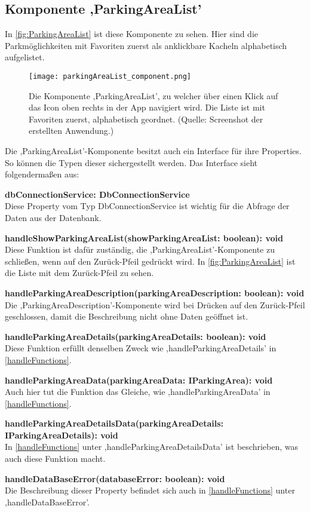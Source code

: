 \subsection{Komponente ,ParkingAreaList'}
\label{parkingAreaList}
In \autoref{fig:ParkingAreaList} ist diese Komponente zu sehen. Hier sind die Parkmöglichkeiten mit Favoriten zuerst als anklickbare Kacheln alphabetisch aufgelistet. 
\begin{figure}[h!]
	\centering
	\texttt{[image: parkingAreaList\_component.png]}
	\caption[Die Komponente ,ParkingAreaList', zu welcher über einen Klick auf das Icon oben rechts in der App navigiert wird. Die Liste ist mit Favoriten zuerst alphabetisch geordnet.]
	{Die Komponente ,ParkingAreaList', zu welcher über einen Klick auf das Icon oben rechts in der App navigiert wird. Die Liste ist mit Favoriten zuerst, alphabetisch geordnet. (Quelle: Screenshot der erstellten Anwendung.)}
	\label{fig:ParkingAreaList}
\end{figure}
\newpage
Die ,ParkingAreaList'-Komponente besitzt auch ein Interface für ihre Properties. So können die Typen dieser sichergestellt werden. Das Interface sieht folgendermaßen aus:
\begin{description}
	\item \textbf{dbConnectionService: DbConnectionService} \\ Diese Property vom Typ DbConnectionService ist wichtig für die Abfrage der Daten aus der Datenbank.
	\item \textbf{handleShowParkingAreaList(showParkingAreaList: boolean): void} \\ Diese Funktion ist dafür zuständig, die ,ParkingAreaList'-Komponente zu schließen, wenn auf den Zurück-Pfeil gedrückt wird. In \autoref{fig:ParkingAreaList} ist die Liste mit dem Zurück-Pfeil zu sehen.
	\item \textbf{handleParkingAreaDescription(parkingAreaDescription: boolean): void} \\ Die ,ParkingAreaDescription'-Komponente wird bei Drücken auf den Zurück-Pfeil geschlossen, damit die Beschreibung nicht ohne Daten geöffnet ist.
	\item \textbf{handleParkingAreaDetails(parkingAreaDetails: boolean): void} \\ Diese Funktion erfüllt denselben Zweck wie ,handleParkingAreaDetails' in \autoref{handleFunctions}.
	\newpage
	\item \textbf{handleParkingAreaData(parkingAreaData: IParkingArea): void} \\ Auch hier tut die Funktion das Gleiche, wie ,handleParkingAreaData' in \autoref{handleFunctions}.
	\item \textbf{handleParkingAreaDetailsData(parkingAreaDetails: IParkingAreaDetails): void} \\ In \autoref{handleFunctions} unter ,handleParkingAreaDetailsData' ist beschrieben, was auch diese Funktion macht.
	\item \textbf{handleDataBaseError(databaseError: boolean): void} \\ Die Beschreibung dieser Property befindet sich auch in \autoref{handleFunctions} unter ,handleDataBaseError'.
\end{description} 

